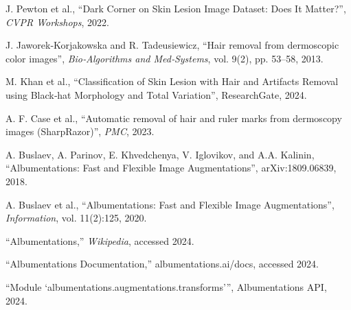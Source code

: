 \begin{thebibliography}{}
J. Pewton et al., “Dark Corner on Skin Lesion Image Dataset: Does It Matter?”, \emph{CVPR Workshops}, 2022.

J. Jaworek‐Korjakowska and R. Tadeusiewicz, “Hair removal from dermoscopic color images”, \emph{Bio‐Algorithms and Med‐Systems}, vol. 9(2), pp. 53–58, 2013.

M. Khan et al., “Classification of Skin Lesion with Hair and Artifacts Removal using Black‐hat Morphology and Total Variation”, ResearchGate, 2024.

A. F. Case et al., “Automatic removal of hair and ruler marks from dermoscopy images (SharpRazor)”, \emph{PMC}, 2023.

A. Buslaev, A. Parinov, E. Khvedchenya, V. Iglovikov, and A.A. Kalinin, “Albumentations: Fast and Flexible Image Augmentations”, arXiv:1809.06839, 2018.

A. Buslaev et al., “Albumentations: Fast and Flexible Image Augmentations”, \emph{Information}, vol. 11(2):125, 2020.

“Albumentations,” \emph{Wikipedia}, accessed 2024.

“Albumentations Documentation,” albumentations.ai/docs, accessed 2024.

“Module `albumentations.augmentations.transforms’”, Albumentations API, 2024.

\end{thebibliography}
